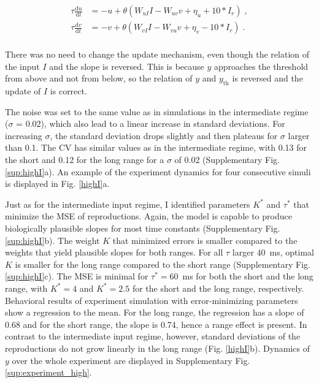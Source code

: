 \documentclass[10pt, a4paper]{article}
\begin{document}
\begin{equation} \label{EqhighI}
	\begin{split}
	\tau\frac{\text{d}u}{\text{d}t} & = -u + \theta(W_{uI}I - W_{uv}v + \eta_u + 10*I_r) \;,\\
	\tau\frac{\text{d}v}{\text{d}t} & = -v + \theta(W_{vI}I - W_{vu}v + \eta_v - 10*I_r) \;.\\
	\end{split}
\end{equation}

There was no need to change the update mechanism, even though the relation of the input $I$ and the slope is reversed. This is because $y$ approaches the threshold from above and not from below, so the relation of $y$ and $y_{\text{th}}$ is reversed and the update of $I$ is correct. 

The noise was set to the same value as in simulations in the intermediate regime ($\sigma$ = 0.02), which also lead to a linear increase in standard deviations. For increasing $\sigma$, the standard deviation drops slightly and then plateaus for $\sigma$ larger than 0.1. The CV has similar values as in the intermediate regime, with 0.13 for the short and 0.12 for the long range for a $\sigma$ of 0.02 (Supplementary Fig. \ref{sup:highI}a). 
An example of the experiment dynamics for four consecutive simuli is displayed in Fig. \ref{highI}a.

Just as for the intermediate input regime, I identified parameters $K^*$ and $\tau^*$ that minimize the MSE of reproductions. 
Again, the model is capable to produce biologically plausible slopes for most time constants (Supplementary Fig. \ref{sup:highI}b). The weight $K$ that minimized errors is smaller compared to the weights that yield plausible slopes for both ranges. 
For all $\tau$ larger 40~ms, optimal $K$ is smaller for the long range compared to the short range (Supplementary Fig. \ref{sup:highI}c).
The MSE is minimal for $\tau^* = 60$~ms for both the short and the long range, with $K^* = 4$ and $K^* = 2.5$  for the short and the long range, respectively. 
Behavioral results of experiment simulation with error-minimizing parameters show a regression to the mean.
For the long range, the regression has a slope of 0.68 and for the short range, the slope is 0.74, hence a range effect is present.
In contrast to the intermediate input regime, however, standard deviations of the reproductions do not grow linearly in the long range (Fig. \ref{highI}b).
Dynamics of $y$ over the whole experiment are displayed in Supplementary Fig. \ref{sup:experiment_high}.
\end{document}
